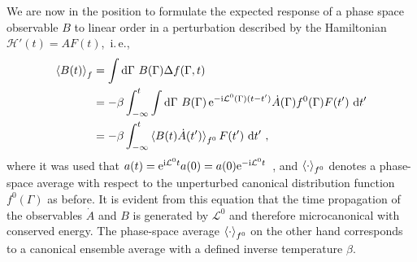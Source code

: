 We are now in the position to formulate the expected response of a phase space observable $B$ to linear order in a perturbation described by the Hamiltonian $\mathcal H'(t) = A F(t)$,~i.\,e.,~
\begin{align}
\braket{B (t)}_f
    &= \int \d \Gamma ~  B (\Gamma) \Delta f (\Gamma, t) \\
    &= - \beta \int_{-\infty}^t 
      \int \d \Gamma ~  
       B (\Gamma) \, {\rm e}^{-\im \mathcal L^0 (\Gamma) (t - t')} \dot{A}(\Gamma)
       f^0(\Gamma) F(t') ~ \d t' \\
    &= - \beta \int_{-\infty}^t 
      \braket{B(t) \dot{A}(t')}_{f^0} F(t') ~ \d t'~,
  \label{eq:lr.dB}
\end{align}
where it was used that $a(t) = {\rm e}^{{\rm i} \mathcal L^0 t} a(0) = a(0) {\rm e}^{-{\rm i} \mathcal L^0 t}$~\cite[p.\,498]{Tuckerman}, and $\braket{\cdot}_{f^0}$ denotes a phase-space average with respect to the unperturbed canonical distribution function $f^0 (\Gamma)$ as before. It is evident from this equation that the time propagation of the observables $\dot {A}$ and $B$ is generated by $\mathcal L^0$ and therefore microcanonical with conserved energy. The phase-space average $\braket{\cdot}_{f^0}$ on the other hand corresponds to a canonical ensemble average with a defined inverse temperature $\beta$.

